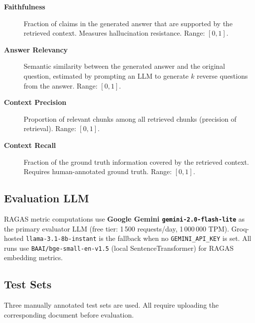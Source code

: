 \documentclass[12pt,a4paper]{article}
\begin{document}
\begin{description}
  \item[\textbf{Faithfulness}] Fraction of claims in the generated answer that are supported by the retrieved context. Measures hallucination resistance. Range: $[0, 1]$.

  \item[\textbf{Answer Relevancy}] Semantic similarity between the generated answer and the original question, estimated by prompting an LLM to generate $k$ reverse questions from the answer. Range: $[0, 1]$.

  \item[\textbf{Context Precision}] Proportion of relevant chunks among all retrieved chunks (precision of retrieval). Range: $[0, 1]$.

  \item[\textbf{Context Recall}] Fraction of the ground truth information covered by the retrieved context. Requires human-annotated ground truth. Range: $[0, 1]$.
\end{description}

\subsection{Evaluation LLM}

RAGAS metric computations use \textbf{Google Gemini \texttt{gemini-2.0-flash-lite}} as the primary evaluator LLM (free tier: 1\,500 requests/day, 1\,000\,000 TPM). Groq-hosted \texttt{llama-3.1-8b-instant} is the fallback when no \texttt{GEMINI\_API\_KEY} is set. All runs use \texttt{BAAI/bge-small-en-v1.5} (local SentenceTransformer) for RAGAS embedding metrics.

\subsection{Test Sets}

Three manually annotated test sets are used. All require uploading the corresponding document before evaluation.
\end{document}
